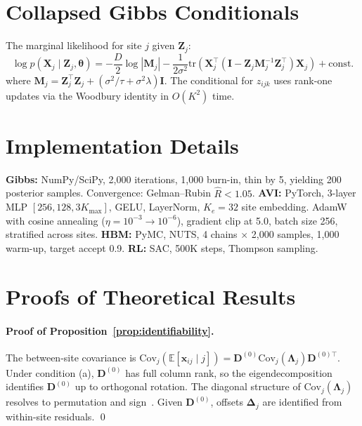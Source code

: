 \documentclass[11pt,a4paper]{article}
\theoremstyle{definition}
\begin{document}
\appendix

\section{Collapsed Gibbs Conditionals}\label{app:gibbs}

The marginal likelihood for site $j$ given $\mathbf{Z}_j$:
\begin{equation}
  \log p(\mathbf{X}_j \mid \mathbf{Z}_j, \boldsymbol{\theta}) = -\frac{D}{2}\log|\mathbf{M}_j| - \frac{1}{2\sigma^2}\mathrm{tr}\!\left(\mathbf{X}_j^\top(\mathbf{I} - \mathbf{Z}_j\mathbf{M}_j^{-1}\mathbf{Z}_j^\top)\mathbf{X}_j\right) + \mathrm{const.}
\end{equation}
where $\mathbf{M}_j = \mathbf{Z}_j^\top\mathbf{Z}_j + (\sigma^2/\tau + \sigma^2\lambda)\mathbf{I}$. The conditional for $z_{ijk}$ uses rank-one updates via the Woodbury identity in $O(K^2)$ time.

\section{Implementation Details}\label{app:impl}

\textbf{Gibbs:} NumPy/SciPy, 2,000 iterations, 1,000 burn-in, thin by 5, yielding 200 posterior samples. Convergence: Gelman--Rubin $\hat{R} < 1.05$. \textbf{AVI:} PyTorch, 3-layer MLP $[256, 128, 3K_{\max}]$, GELU, LayerNorm, $K_e{=}32$ site embedding. AdamW with cosine annealing ($\eta{=}10^{-3} \to 10^{-6}$), gradient clip at 5.0, batch size 256, stratified across sites. \textbf{HBM:} PyMC, NUTS, 4 chains $\times$ 2,000 samples, 1,000 warm-up, target accept 0.9. \textbf{RL:} SAC, 500K steps, Thompson sampling.

\section{Proofs of Theoretical Results}\label{app:proofs}

\paragraph{Proof of Proposition~\ref{prop:identifiability}.}
The between-site covariance is $\mathrm{Cov}_j(\mathbb{E}[\mathbf{x}_{ij} \mid j]) = \mathbf{D}^{(0)}\mathrm{Cov}_j(\boldsymbol{\Lambda}_j)\mathbf{D}^{(0)\top}$. Under condition (a), $\mathbf{D}^{(0)}$ has full column rank, so the eigendecomposition identifies $\mathbf{D}^{(0)}$ up to orthogonal rotation. The diagonal structure of $\mathrm{Cov}_j(\boldsymbol{\Lambda}_j)$ resolves to permutation and sign~\citep{broderick2012}. Given $\mathbf{D}^{(0)}$, offsets $\boldsymbol{\Delta}_j$ are identified from within-site residuals. \qed
\end{document}
